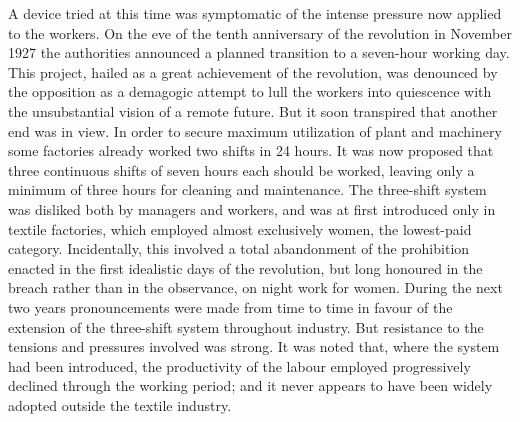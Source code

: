 A device tried at this time was symptomatic of the intense pressure now applied to the workers. On the eve of the tenth anniversary of the revolution in November 1927 the authorities announced a planned transition to a seven-hour working day. This project, hailed as a great achievement of the revolution, was denounced by the opposition as a demagogic attempt to lull the workers into quiescence with the unsubstantial vision of a remote future. But it soon transpired that another end was in view. In order to secure maximum utilization of plant and machinery some factories already worked two shifts in 24 hours. It was now proposed that three continuous shifts of seven hours each should be worked, leaving only a minimum of three hours for cleaning and maintenance. The three-shift system was disliked both by managers and workers, and was at first introduced only in textile factories, which employed almost exclusively women, the lowest-paid category. Incidentally, this involved a total abandonment of the prohibition enacted in the first idealistic days of the revolution, but long honoured in the breach rather than in the observance, on night work for women. During the next two years pronouncements were made from time to time in favour of the extension of the three-shift system throughout industry. But resistance to the tensions and pressures involved was strong. It was noted that, where the system had been introduced, the productivity of the labour employed progressively declined through the working period; and it never appears to have been widely adopted outside the textile industry. 

